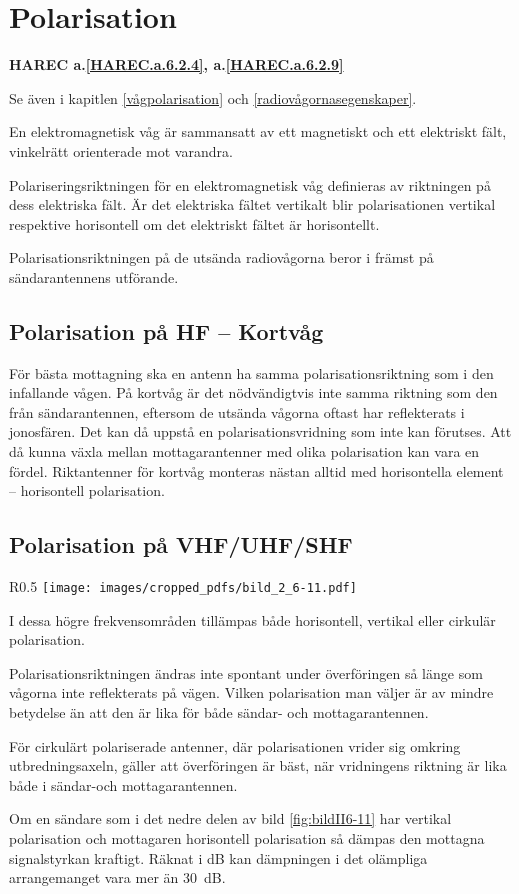 \section{Polarisation}
\textbf{
HAREC a.\ref{HAREC.a.6.2.4}\label{myHAREC.a.6.2.4}, a.\ref{HAREC.a.6.2.9}\label{myHAREC.a.6.2.9}
}

Se även i kapitlen \ref{vågpolarisation} och \ref{radiovågornasegenskaper}.

En elektromagnetisk våg är sammansatt av ett magnetiskt och ett
elektriskt fält, vinkelrätt orienterade mot varandra.

Polariseringsriktningen för en elektromagnetisk våg definieras av riktningen på
dess elektriska fält.
Är det elektriska fältet vertikalt blir polarisationen vertikal respektive
horisontell om det elektriskt fältet är horisontellt.

Polarisationsriktningen på de utsända radiovågorna beror i främst på
sändarantennens utförande.

\subsection{Polarisation på HF -- Kortvåg}
För bästa mottagning ska en antenn ha samma polarisationsriktning som i den
infallande vågen.
På kortvåg är det nödvändigtvis inte samma riktning som den från
sändarantennen, eftersom de utsända vågorna oftast har reflekterats i
jonosfären.
Det kan då uppstå en polarisationsvridning som inte kan förutses.
Att då kunna växla mellan mottagarantenner med olika polarisation kan vara en
fördel.
Riktantenner för kortvåg monteras nästan alltid med horisontella element --
horisontell polarisation.

\subsection{Polarisation på VHF/UHF/SHF}

\begin{wrapfigure}{R}{0.5\textwidth}
  \texttt{[image: images/cropped\_pdfs/bild\_2\_6-11.pdf]}
  \caption{Inverkan av polarisation}
  \label{fig:bildII6-11}
\end{wrapfigure}

I dessa högre frekvensområden tillämpas både horisontell, vertikal eller
cirkulär polarisation.

Polarisationsriktningen ändras inte spontant under överföringen så
länge som vågorna inte reflekterats på vägen.
Vilken polarisation man väljer är av mindre betydelse än att den är lika
för både sändar- och mottagarantennen.

För cirkulärt polariserade antenner, där polarisationen vrider sig
omkring utbredningsaxeln, gäller att överföringen är bäst, när
vridningens riktning är lika både i sändar-och mottagarantennen.

Om en sändare som i det nedre delen av bild \ref{fig:bildII6-11} har vertikal
polarisation och mottagaren horisontell polarisation så dämpas den mottagna
signalstyrkan kraftigt.
Räknat i dB kan dämpningen i det olämpliga arrangemanget vara mer än 30~dB.